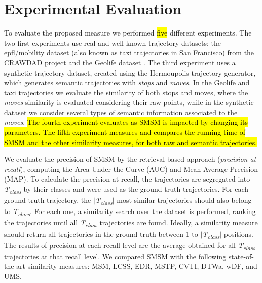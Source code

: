 %



\chapter[Experiments]{Experimental Evaluation}\label{sec:experiments}

\begin{flushright}
     
\end{flushright}

To evaluate the proposed measure we performed \hl{five} different experiments. The two first experiments use real and well known trajectory datasets: the epfl/mobility dataset (also known as taxi trajectories in San Francisco) from the CRAWDAD project \cite{epfl-mobility-20090224} and the Geolife dataset \cite{zheng2009mining}. The third experiment uses a synthetic trajectory dataset, created using the Hermoupolis \cite{Pelekis-Hermoupolis} trajectory generator, which generates semantic trajectories with \emph{stops} and \emph{moves}. In the Geolife and taxi trajectories we evaluate the similarity of both stops and moves, where the \emph{moves} similarity is evaluated considering their raw points, while in the synthetic dataset we consider several types of semantic information associated to the \emph{moves}. \hl{The fourth experiment evaluates as SMSM is impacted by changing its parameters. The fifth experiment measures and compares the running time of SMSM and the other similarity measures, for both raw and semantic trajectories.}

We evaluate the precision of SMSM by the retrieval-based approach (\textit{precision at recall}), computing the Area Under the Curve (AUC) and Mean Average Precision (MAP). To calculate the precision at recall, the trajectories are segregated into \textit{T\textsubscript{class}} by their classes and were used as the ground truth trajectories. For each ground truth trajectory, the $|$\textit{T\textsubscript{class}}$|$ most similar trajectories should also belong to \textit{T\textsubscript{class}}. For each one, a similarity search over the dataset is performed, ranking the trajectories until all \textit{T\textsubscript{class}} trajectories are found. Ideally, a similarity measure should return all trajectories in the ground truth between 1 to $|$\textit{T\textsubscript{class}}$|$ positions. The results of precision at each recall level are the average obtained for all \textit{T\textsubscript{class}} trajectories at that recall level. {We compared SMSM with the following state-of-the-art similarity measures: MSM, LCSS, EDR, MSTP, CVTI, DTWa, wDF, and UMS.}

